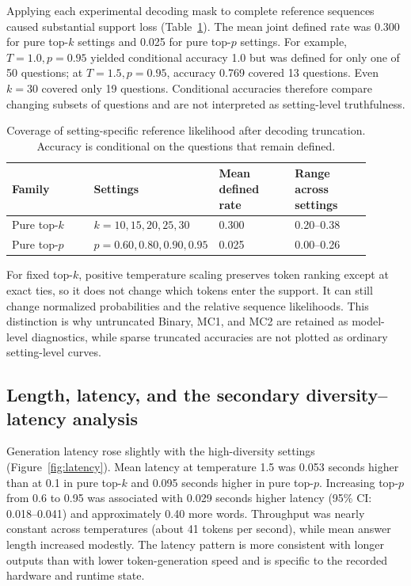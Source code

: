 \documentclass[11pt]{article}
\begin{document}
Applying each experimental decoding mask to complete reference sequences caused
substantial support loss (Table~\ref{tab:reference-coverage}). The mean joint
defined rate was 0.300 for pure top-$k$ settings and 0.025 for pure top-$p$
settings. For example, $T=1.0,p=0.95$ yielded conditional accuracy 1.0 but was
defined for only one of 50 questions; at $T=1.5,p=0.95$, accuracy 0.769 covered
13 questions. Even $k=30$ covered only 19 questions. Conditional accuracies
therefore compare changing subsets of questions and are not interpreted as
setting-level truthfulness.

\begin{table}[ht]
\centering
\small
\caption{Coverage of setting-specific reference likelihood after decoding
truncation. Accuracy is conditional on the questions that remain defined.}
\label{tab:reference-coverage}
\begin{tabular}{p{0.24\linewidth}p{0.22\linewidth}p{0.22\linewidth}p{0.22\linewidth}}
\toprule
Family & Settings & Mean defined rate & Range across settings \\
\midrule
Pure top-$k$ & $k=10,15,20,25,30$ & 0.300 & 0.20--0.38 \\
Pure top-$p$ & $p=0.60,0.80,0.90,0.95$ & 0.025 & 0.00--0.26 \\
\bottomrule
\end{tabular}
\end{table}

For fixed top-$k$, positive temperature scaling preserves token ranking except
at exact ties, so it does not change which tokens enter the support. It can
still change normalized probabilities and the relative sequence likelihoods.
This distinction is why untruncated Binary, MC1, and MC2 are retained as
model-level diagnostics, while sparse truncated accuracies are not plotted as
ordinary setting-level curves.

\subsection{Length, latency, and the secondary diversity--latency analysis}

Generation latency rose slightly with the high-diversity settings
(Figure~\ref{fig:latency}). Mean latency at temperature 1.5 was 0.053 seconds
higher than at 0.1 in pure top-$k$ and 0.095 seconds higher in pure top-$p$.
Increasing top-$p$ from 0.6 to 0.95 was associated with 0.029 seconds higher
latency (95\% CI: 0.018--0.041) and approximately 0.40 more words. Throughput
was nearly constant across temperatures (about 41 tokens per second), while
mean answer length increased modestly. The latency pattern is more consistent
with longer outputs than with lower token-generation speed and is specific to
the recorded hardware and runtime state.
\end{document}
